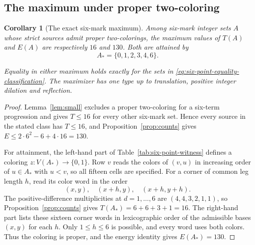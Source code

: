 \documentclass[11pt,a4paper]{article}
\newtheorem{corollary}[theorem]{Corollary}
\theoremstyle{definition}
\numberwithin{equation}{section}
\begin{document}
\subsection{The maximum under proper two-coloring}
\begin{corollary}[The exact six-mark maximum]\label{prop:six-point-extremal}
Among six-mark integer sets $A$ whose strict sources admit proper two-colorings, the maximum values of $T(A)$ and $E(A)$ are respectively $16$ and $130$. Both are attained by
\[
A_*=\{0,1,2,3,4,6\}.
\]

Equality in either maximum holds exactly for the sets in
\eqref{eq:six-point-equality-classification}. The maximizer has one type up to
translation, positive integer dilation and reflection.
\end{corollary}
\begin{proof}
Lemma~\ref{lem:small} excludes a proper two-coloring for a six-term progression and gives $T\le16$ for every other six-mark set. Hence every source in the stated class has $T\le16$, and Proposition~\ref{prop:counts} gives $E\le2\cdot6^2-6+4\cdot16=130$.

For attainment, the left-hand part of Table~\ref{tab:six-point-witness} defines a coloring $z:V(A_*)\to\{0,1\}$. Row $v$ reads the colors of $(v,u)$ in increasing order of $u\in A_*$ with $u<v$, so all fifteen cells are specified. For a corner of common leg length $h$, read its color word in the order
\[
(x,y),\quad (x+h,y),\quad (x+h,y+h).
\]
The positive-difference multiplicities at $d=1,\ldots,6$ are $(4,4,3,2,1,1)$, so Proposition~\ref{prop:counts} gives $T(A_*)=6+6+3+1=16$. The right-hand part lists these sixteen corner words in lexicographic order of the admissible bases $(x,y)$ for each $h$. Only $1\le h\le6$ is possible, and every word uses both colors. Thus the coloring is proper, and the energy identity gives $E(A_*)=130$.


\end{proof}
\end{document}
